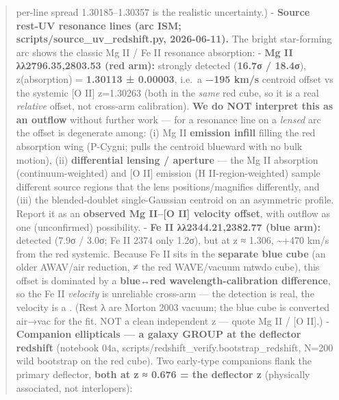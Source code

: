 \documentclass[
]{article}
\newcommand{\BreakablePath}[1]{{\ttfamily\sloppy #1}}
\begin{document}
\begin{quote}
per-line spread 1.30185--1.30357 is the realistic uncertainty.) -
\textbf{Source rest-UV resonance lines (arc ISM;
\BreakablePath{scripts/\discretionary{}{}{}source\_\discretionary{}{}{}uv\_\discretionary{}{}{}redshift.\discretionary{}{}{}py},
2026-06-11).} The bright star-forming arc shows the classic Mg II / Fe
II resonance absorption: - \textbf{Mg II λλ2796.35,2803.53 (red arm):}
strongly detected (\textbf{16.7σ / 18.4σ}), z(absorption) =
\textbf{1.30113 ± 0.00003}, i.e.~a \textbf{−195 km/s} centroid offset vs
the systemic {[}O II{]} z=1.30263 (both in the \emph{same} red cube, so
it is a real \emph{relative} offset, not cross-arm calibration).
\textbf{We do NOT interpret this as an outflow} without further work ---
for a resonance line on a \emph{lensed} arc the offset is degenerate
among: (i) Mg II \textbf{emission infill} filling the red absorption
wing (P-Cygni; pulls the centroid blueward with no bulk motion), (ii)
\textbf{differential lensing / aperture} --- the Mg II absorption
(continuum-weighted) and {[}O II{]} emission (H II-region-weighted)
sample different source regions that the lens positions/magnifies
differently, and (iii) the blended-doublet single-Gaussian centroid on
an asymmetric profile. Report it as an \textbf{observed Mg II--{[}O
II{]} velocity offset}, with outflow as one (unconfirmed) possibility. -
\textbf{Fe II λλ2344.21,2382.77 (blue arm):} detected (7.9σ / 3.0σ; Fe
II 2374 only 1.2σ), but at z ≈ 1.306, \textasciitilde+470 km/s from the
red systemic. Because Fe II sits in the \textbf{separate blue cube} (an
older \BreakablePath{AWAV}/air reduction, ≠ the red
\BreakablePath{WAVE}/vacuum mtwdo cube), this offset is dominated by a
\textbf{blue↔red wavelength-calibration difference}, so the Fe II
\emph{velocity} is unreliable cross-arm --- the detection is real, the
velocity is a
\BreakablePath{[TODO: cross-\discretionary{}{}{}calibrate the blue arm]}.
(Rest λ are Morton 2003 vacuum; the blue cube is converted air→vac for
the fit. NOT a clean independent z --- quote Mg II / {[}O II{]}.) -
\textbf{Companion ellipticals --- a galaxy GROUP at the deflector
redshift} (notebook 04a,
\BreakablePath{scripts/\discretionary{}{}{}redshift\_\discretionary{}{}{}verify.\discretionary{}{}{}bootstrap\_\discretionary{}{}{}redshift},
N=200 wild bootstrap on the red cube). Two early-type companions flank
the primary deflector, \textbf{both at z ≈ 0.676 = the deflector z}
(physically associated, not interlopers):
\end{quote}
\end{document}
